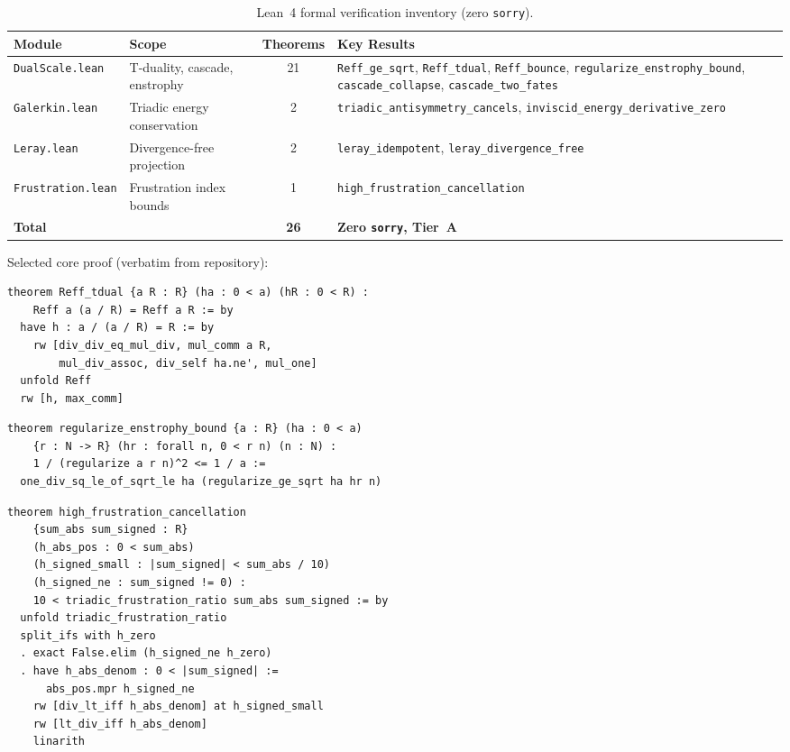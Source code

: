 \documentclass[11pt,a4paper,twoside]{article}
\begin{document}
\begin{table}[H]
\centering
\caption{Lean~4 formal verification inventory (zero \texttt{sorry}).}
\label{tab:lean4modules}
\begin{tabularx}{\textwidth}{llcX}
\toprule
\textbf{Module} & \textbf{Scope} & \textbf{Theorems} & \textbf{Key Results} \\
\midrule
\texttt{DualScale.lean} & T-duality, cascade, enstrophy & 21 &
  \texttt{Reff\_ge\_sqrt}, \texttt{Reff\_tdual}, \texttt{Reff\_bounce},
  \texttt{regularize\_enstrophy\_bound}, \texttt{cascade\_collapse},
  \texttt{cascade\_two\_fates} \\
\texttt{Galerkin.lean} & Triadic energy conservation & 2 &
  \texttt{triadic\_antisymmetry\_cancels},
  \texttt{inviscid\_energy\_derivative\_zero} \\
\texttt{Leray.lean} & Divergence-free projection & 2 &
  \texttt{leray\_idempotent},
  \texttt{leray\_divergence\_free} \\
\texttt{Frustration.lean} & Frustration index bounds & 1 &
  \texttt{high\_frustration\_cancellation} \\
\midrule
\textbf{Total} & & \textbf{26} & \textbf{Zero \texttt{sorry}, Tier~A} \\
\bottomrule
\end{tabularx}
\end{table}

Selected core proof (verbatim from repository):

\begin{lstlisting}[language=lean4,caption={T-duality symmetry --- \texttt{DualScale.lean}},label=lst:tdual]
theorem Reff_tdual {a R : R} (ha : 0 < a) (hR : 0 < R) :
    Reff a (a / R) = Reff a R := by
  have h : a / (a / R) = R := by
    rw [div_div_eq_mul_div, mul_comm a R,
        mul_div_assoc, div_self ha.ne', mul_one]
  unfold Reff
  rw [h, max_comm]
\end{lstlisting}

\begin{lstlisting}[language=lean4,caption={Enstrophy bound --- \texttt{DualScale.lean}},label=lst:enstrophy]
theorem regularize_enstrophy_bound {a : R} (ha : 0 < a)
    {r : N -> R} (hr : forall n, 0 < r n) (n : N) :
    1 / (regularize a r n)^2 <= 1 / a :=
  one_div_sq_le_of_sqrt_le ha (regularize_ge_sqrt ha hr n)
\end{lstlisting}

\begin{lstlisting}[language=lean4,caption={Frustration high-cancellation bound --- \texttt{Frustration.lean}},label=lst:frustration]
theorem high_frustration_cancellation
    {sum_abs sum_signed : R}
    (h_abs_pos : 0 < sum_abs)
    (h_signed_small : |sum_signed| < sum_abs / 10)
    (h_signed_ne : sum_signed != 0) :
    10 < triadic_frustration_ratio sum_abs sum_signed := by
  unfold triadic_frustration_ratio
  split_ifs with h_zero
  . exact False.elim (h_signed_ne h_zero)
  . have h_abs_denom : 0 < |sum_signed| :=
      abs_pos.mpr h_signed_ne
    rw [div_lt_iff h_abs_denom] at h_signed_small
    rw [lt_div_iff h_abs_denom]
    linarith
\end{lstlisting}
\end{document}
